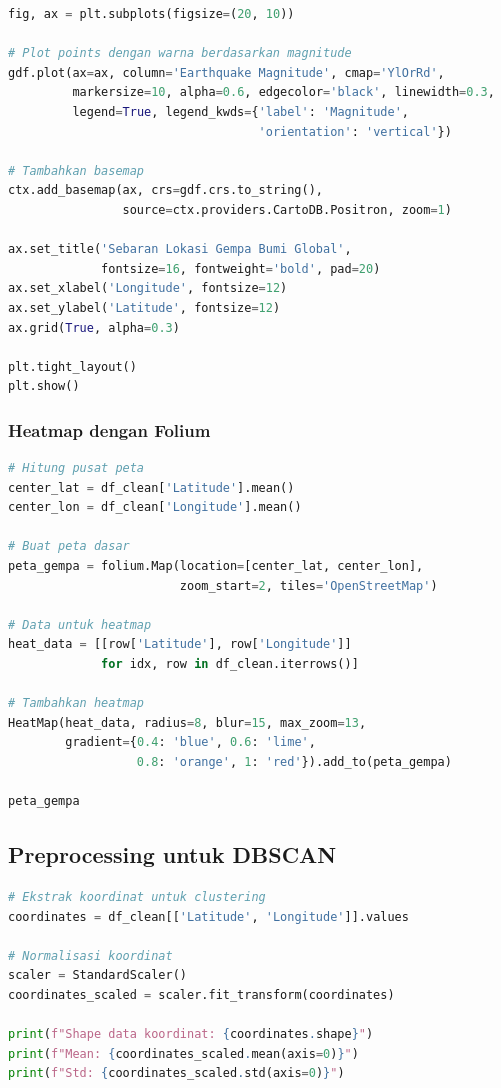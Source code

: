 \documentclass[12pt,a4paper]{article}
\begin{document}
\begin{lstlisting}[language=Python, caption=Visualisasi Peta Sebaran Gempa dengan Basemap]
fig, ax = plt.subplots(figsize=(20, 10))

# Plot points dengan warna berdasarkan magnitude
gdf.plot(ax=ax, column='Earthquake Magnitude', cmap='YlOrRd', 
         markersize=10, alpha=0.6, edgecolor='black', linewidth=0.3, 
         legend=True, legend_kwds={'label': 'Magnitude', 
                                   'orientation': 'vertical'})

# Tambahkan basemap
ctx.add_basemap(ax, crs=gdf.crs.to_string(), 
                source=ctx.providers.CartoDB.Positron, zoom=1)

ax.set_title('Sebaran Lokasi Gempa Bumi Global', 
             fontsize=16, fontweight='bold', pad=20)
ax.set_xlabel('Longitude', fontsize=12)
ax.set_ylabel('Latitude', fontsize=12)
ax.grid(True, alpha=0.3)

plt.tight_layout()
plt.show()
\end{lstlisting}

\subsubsection{Heatmap dengan Folium}

\begin{lstlisting}[language=Python, caption=Visualisasi Heatmap Gempa Bumi]
# Hitung pusat peta
center_lat = df_clean['Latitude'].mean()
center_lon = df_clean['Longitude'].mean()

# Buat peta dasar
peta_gempa = folium.Map(location=[center_lat, center_lon], 
                        zoom_start=2, tiles='OpenStreetMap')

# Data untuk heatmap
heat_data = [[row['Latitude'], row['Longitude']] 
             for idx, row in df_clean.iterrows()]

# Tambahkan heatmap
HeatMap(heat_data, radius=8, blur=15, max_zoom=13, 
        gradient={0.4: 'blue', 0.6: 'lime', 
                  0.8: 'orange', 1: 'red'}).add_to(peta_gempa)

peta_gempa
\end{lstlisting}

\subsection{Preprocessing untuk DBSCAN}

\begin{lstlisting}[language=Python, caption=Ekstraksi dan Normalisasi Fitur]
# Ekstrak koordinat untuk clustering
coordinates = df_clean[['Latitude', 'Longitude']].values

# Normalisasi koordinat
scaler = StandardScaler()
coordinates_scaled = scaler.fit_transform(coordinates)

print(f"Shape data koordinat: {coordinates.shape}")
print(f"Mean: {coordinates_scaled.mean(axis=0)}")
print(f"Std: {coordinates_scaled.std(axis=0)}")
\end{lstlisting}
\end{document}
